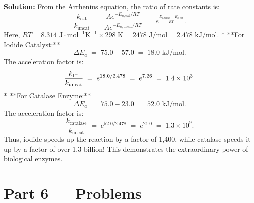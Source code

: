 \documentclass[12pt, a4paper]{book}
\begin{document}
\begin{problembox}
\begin{enumerate}[label=\textbf{E\arabic*.}]
        \textbf{Solution:}
        From the Arrhenius equation, the ratio of rate constants is:
        \[
          \frac{k_{\text{cat}}}{k_{\text{uncat}}} \;=\; \frac{A e^{-E_{a,\text{cat}}/RT}}{A e^{-E_{a,\text{uncat}}/RT}} \;=\; e^{\frac{E_{a,\text{uncat}} - E_{a,\text{cat}}}{RT}}.
        \]
        Here, $R T = 8.314 \text{ J}\cdot\text{mol}^{-1}\text{K}^{-1} \times 298 \text{ K} = 2478 \text{ J/mol} = 2.478 \text{ kJ/mol}$.
        * **For Iodide Catalyst:**
        \[
          \Delta E_a \;=\; 75.0 - 57.0 \;=\; 18.0 \text{ kJ/mol}.
        \]
        The acceleration factor is:
        \[
          \frac{k_{\ce{I-}}}{k_{\text{uncat}}} \;=\; e^{18.0 / 2.478} \;=\; e^{7.26} \;=\; 1.4 \times 10^3.
        \]
        * **For Catalase Enzyme:**
        \[
          \Delta E_a \;=\; 75.0 - 23.0 \;=\; 52.0 \text{ kJ/mol}.
        \]
        The acceleration factor is:
        \[
          \frac{k_{\text{catalase}}}{k_{\text{uncat}}} \;=\; e^{52.0 / 2.478} \;=\; e^{21.0} \;=\; 1.3 \times 10^9.
        \]
        Thus, iodide speeds up the reaction by a factor of 1,400, while catalase speeds it up by a factor of over 1.3 billion! This demonstrates the extraordinary power of biological enzymes.
\end{enumerate}
\end{problembox}

\newpage

\section{Part 6 --- Problems}
\end{document}
